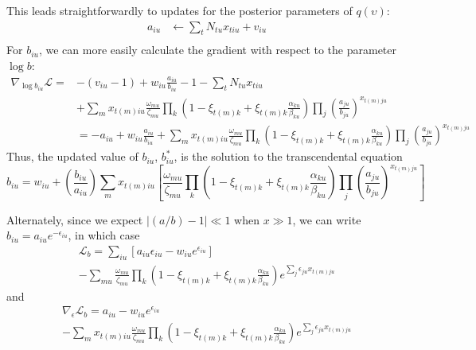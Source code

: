 \documentclass[11pt]{article}
\begin{document}
This leads straightforwardly to updates for the posterior parameters of $q(\upsilon)$:
\begin{align}
    a_{iu} &\leftarrow \sum_t N_{tu} x_{tiu} + v_{iu} \\
\end{align}
For $b_{iu}$, we can more easily calculate the gradient with respect to the parameter $\log b$:
\begin{align}
    \nabla_{\log b_{iu}} \mathcal{L} = &-(v_{iu} - 1) +
    w_{iu} \frac{a_{iu}}{b_{iu}} - 1 - \sum_t N_{tu} x_{tiu} \\
    & + \sum_m x_{t(m)iu} \frac{\omega_{mu}}{\zeta_{mu}}
    \prod_k \left(1 - \xi_{t(m)k} + \xi_{t(m)k}
    \frac{\alpha_{ku}}{\beta_{ku}}\right)
    \prod_j \left(\frac{a_{ju}}{b_{ju}}\right)^{x_{t(m)ju}} \\
    &= -a_{iu} + w_{iu} \frac{a_{iu}}{b_{iu}}
    + \sum_m x_{t(m)iu} \frac{\omega_{mu}}{\zeta_{mu}}
    \prod_k \left(1 - \xi_{t(m)k} + \xi_{t(m)k}
    \frac{\alpha_{ku}}{\beta_{ku}}\right)
    \prod_j \left(\frac{a_{ju}}{b_{ju}}\right)^{x_{t(m)ju}}
\end{align}
Thus, the updated value of $b_{iu}$, $b^*_{iu}$, is the solution to the transcendental equation
\begin{equation}
    b_{iu} = w_{iu} + \left( \frac{b_{iu}}{a_{iu}}\right) \sum_{m} x_{t(m)iu}\left[ \frac{\omega_{mu}}{\zeta_{mu}} \prod_k \left( 1 - \xi_{t(m)k} + \xi_{t(m)k} \frac{\alpha_{ku}}{\beta_{ku}}\right)\prod_{j} \left(\frac{a_{ju}}{b_{ju}} \right)^{x_{t(m)ju}} \right]
\end{equation}

Alternately, since we expect $\lvert (a/b) - 1 \rvert \ll 1$ when $x \gg 1$, we can write $b_{iu} = a_{iu}e^{-\epsilon_{iu}}$, in which case
\begin{multline}
    \mathcal{L}_b = \sum_{iu} \left[a_{iu} \epsilon_{iu} - w_{iu} e^{\epsilon_{iu}}\right] \\
     - \sum_{mu} \frac{\omega_{mu}}{\zeta_{mu}}
    \prod_k \left(1 - \xi_{t(m)k} + \xi_{t(m)k}
    \frac{\alpha_{ku}}{\beta_{ku}}\right)
    e^{\sum_j \epsilon_{ju} x_{t(m)ju}}
\end{multline}
and
\begin{multline}
    \nabla_\epsilon \mathcal{L}_b = a_{iu} - w_{iu} e^{\epsilon_{iu}} \\
    - \sum_m x_{t(m)iu} \frac{\omega_{mu}}{\zeta_{mu}}
    \prod_k \left(1 - \xi_{t(m)k} + \xi_{t(m)k}
    \frac{\alpha_{ku}}{\beta_{ku}}\right)
    e^{\sum_j \epsilon_{ju} x_{t(m)ju}}
\end{multline}
\end{document}
